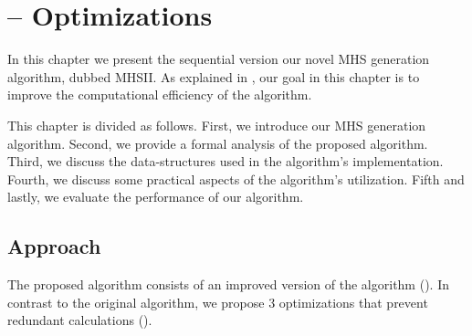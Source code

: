 \renewcommand{\BrainFuckChapter}{%
  {+}{+}{[}{-}{-}{-}{-}{-}{-}{-}{-}{-}{-}{>}{+}{<}{]}{>}{.}{-}{-}{-}{-}{-}{.}{+}{+}{+}{+}{+}{+}{+}{+}{+}{+}{+}{.}{>}{-}{[}{-}{-}{-}{-}{-}{>}{+}{<}{]}{>}{-}{.}{-}{-}{[}{-}{-}{-}{>}{+}{+}{<}{]}{>}{.}{-}{-}{[}{-}{-}
  {>}{+}{+}{+}{<}{]}{>}{.}{[}{-}{-}{-}{>}{+}{+}{<}{]}{>}{+}{+}{.}{[}{-}{-}{>}{+}{+}{+}{+}{+}{<}{]}{>}{-}{.}{+}{[}{-}{-}{-}{>}{+}{<}{]}{>}{.}{+}{+}{+}{+}{.}{-}{-}{-}{-}{-}{-}{-}{-}{-}{-}{-}{.}{+}{+}{+}{+}{.}{-}{-}
  {-}{-}{.}{-}{[}{-}{-}{-}{>}{+}{<}{]}{>}{+}{+}{.}{[}{-}{>}{+}{+}{+}{+}{+}{<}{]}{>}{-}{.}{-}{-}{[}{-}{-}{-}{>}{+}{<}{]}{>}{-}{.}{-}{-}{-}{-}{-}{-}{-}{-}{-}{-}{-}{.}{+}{+}{+}{+}{+}{+}{.}{-}{.}{+}{+}{+}{+}{+}{.}{-}
  {-}{-}{-}{<}{-}{>}{-}{<}{>}{<}{+}{<}{+}{<}{+}{-}{>}{-}{+}{<}{<}{+}{+}{<}{-}{<}{>}{-}{-}{-}{<}{>}{+}{>}{>}{<}{<}{+}{<}{>}{-}{<}{<}{+}{<}{>}{<}{<}{+}{-}{+}{-}{<}{+}{<}{+}{>}{<}{+}{<}{>}{<}{>}{+}{-}{+}{-}{+}{>}{-}
}

\renewcommand{\LifeChapter}{y}
\chapter{\mhsII{} -- Optimizations}

\label{sec:mhs2o}
In this chapter we present the sequential version our novel \ac{MHS}
generation algorithm, dubbed \ac{MHSII}.
%
As explained in
, our
goal in this chapter is to improve the computational efficiency of the
\staccato{} algorithm.

This chapter is divided as follows.
%
First, we introduce our \ac{MHS} generation algorithm.
%
Second, we provide a formal analysis of the proposed algorithm.
%
Third, we discuss the data-structures used in the algorithm's
implementation.
%
Fourth, we discuss some practical aspects of the algorithm's
utilization.
%
Fifth and lastly, we evaluate the performance of our algorithm.

\section{Approach}
\label{sec:mhs2o:approach}
%
The proposed algorithm consists of an improved version of the
\staccato{} algorithm \citep{Abreu09b}
().
%
In contrast to the original algorithm, we propose $3$ optimizations
that prevent redundant calculations ().

